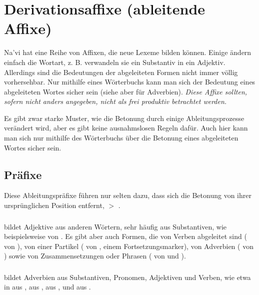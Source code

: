 
\section{Derivationsaffixe (ableitende Affixe)}\label{lingop:affixes}
\noindent Na'vi hat eine Reihe von Affixen, die neue Lexeme bilden können. Einige ändern einfach die Wortart, z. B. verwandeln sie ein Substantiv in ein Adjektiv. Allerdings sind die Bedeutungen der abgeleiteten Formen nicht immer völlig vorhersehbar. Nur mithilfe eines Wörterbuchs kann man sich der Bedeutung eines abgeleiteten Wortes sicher sein (siehe aber  für Adverbien). \textit{Diese Affixe sollten, sofern nicht anders angegeben, nicht als frei produktiv betrachtet werden.}

Es gibt zwar starke Muster, wie die Betonung durch einige Ableitungsprozesse verändert wird, aber es gibt keine ausnahmslosen Regeln dafür. Auch hier kann man sich nur mithilfe des Wörterbuchs über die Betonung eines abgeleiteten Wortes sicher sein.

\subsection{Präfixe} Diese Ableitungspräfixe führen nur selten dazu, dass sich die Betonung von ihrer ursprünglichen Position entfernt,   $>$  . 

\subsubsection{}  bildet Adjektive aus anderen Wörtern, sehr häufig aus Substantiven, wie beispielsweise   von  . Es gibt aber auch Formen, die von Verben abgeleitet sind (  von  ), von einer Partikel (  von , einem Fortsetzungsmarker), von Adverbien (  von  ) sowie von Zusammensetzungen oder Phrasen (  von   und  ).

\subsubsection{}  bildet Adverbien aus Substantiven, Pronomen, Adjektiven und Verben, wie etwa in   aus ,   aus  ,   aus  , und   aus  . 

